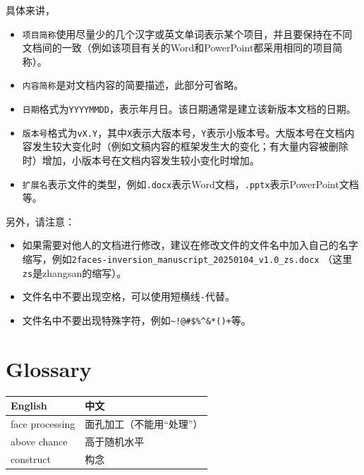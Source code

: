 \documentclass[]{ctexbook}
\providecommand{\tightlist}{%
  \setlength{\itemsep}{0pt}\setlength{\parskip}{0pt}}
\theoremstyle{definition}
\theoremstyle{definition}
\theoremstyle{definition}
\theoremstyle{definition}
\theoremstyle{remark}
\begin{document}
具体来讲，

\begin{itemize}
\tightlist
\item
  \texttt{项目简称}使用尽量少的几个汉字或英文单词表示某个项目，并且要保持在不同文档间的一致（例如该项目有关的Word和PowerPoint都采用相同的项目简称）。
\item
  \texttt{内容简称}是对文档内容的简要描述，此部分可省略。
\item
  \texttt{日期}格式为\texttt{YYYYMMDD}，表示年月日。该日期通常是建立该新版本文档的日期。
\item
  \texttt{版本号}格式为\texttt{vX.Y}，其中\texttt{X}表示大版本号，\texttt{Y}表示小版本号。大版本号在文档内容发生较大变化时（例如文稿内容的框架发生大的变化；有大量内容被删除时）增加，小版本号在文档内容发生较小变化时增加。
\item
  \texttt{扩展名}表示文件的类型，例如\texttt{.docx}表示Word文档，\texttt{.pptx}表示PowerPoint文档等。
\end{itemize}

另外，请注意：

\begin{itemize}
\tightlist
\item
  如果需要对他人的文档进行修改，建议在修改文件的文件名中加入自己的名字缩写，例如\texttt{2faces-inversion\_manuscript\_20250104\_v1.0\_zs.docx} （这里\texttt{zs}是zhangsan的缩写）。
\item
  文件名中不要出现空格，可以使用短横线\texttt{-}代替。
\item
  文件名中不要出现特殊字符，例如\texttt{\textasciitilde{}!@\#\$\%\^{}\&*()+}等。
\end{itemize}

\chapter{Glossary}\label{glossary}

\begin{longtable}[]{@{}ll@{}}
\toprule\noalign{}
English & 中文 \\
\midrule\noalign{}
\endhead
\bottomrule\noalign{}
\endlastfoot
face processing & 面孔加工（不能用``处理''） \\
above chance & 高于随机水平 \\
construct & 构念 \\
\end{longtable}



\backmatter
\printindex
\end{document}
